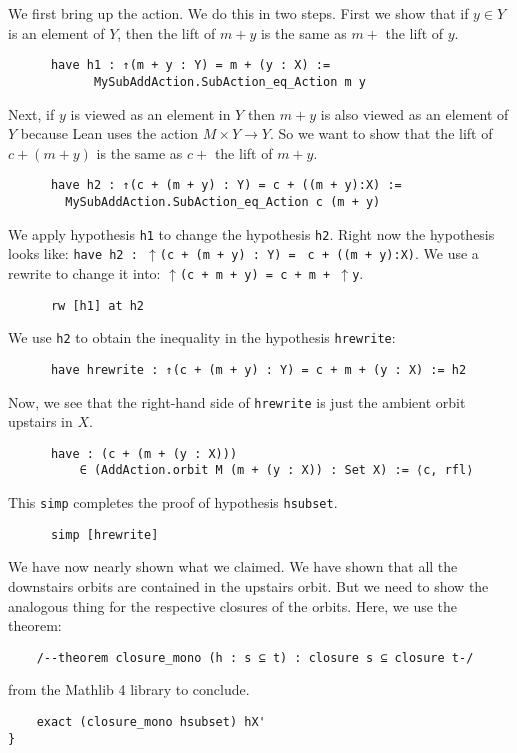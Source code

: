 \documentclass[11pt]{article}
\theoremstyle{definition}              %
\theoremstyle{definition}              %
\theoremstyle{definition}              %
\begin{document}
We first bring up the action. We do this in two steps. First we show that if $y \in Y$ is an element of $Y$, then the lift of $m+y$ is the same as $m+$ the lift of $y$.
\begin{lstlisting}
      have h1 : ↑(m + y : Y) = m + (y : X) :=
            MySubAddAction.SubAction_eq_Action m y
\end{lstlisting}
Next, if $y$ is viewed as an element in $Y$ then $m+y$ is also viewed as an element of $Y$ because Lean uses the action $M \times Y \to Y$. So we want to show that the lift of $c+(m+y)$ is the same as $c+$ the lift of $m+y$.
\begin{lstlisting}
      have h2 : ↑(c + (m + y) : Y) = c + ((m + y):X) :=
        MySubAddAction.SubAction_eq_Action c (m + y)
\end{lstlisting}
We apply hypothesis \verb|h1| to change the hypothesis \verb|h2|. Right now the hypothesis looks like: \verb|have h2 : |$\uparrow$\verb|(c + (m + y) : Y) = | \verb|c + ((m + y):X)|. We use a rewrite to change it into: $\uparrow$\verb|(c + m + y) = c + m + |$\uparrow$\verb|y|.
\begin{lstlisting}
      rw [h1] at h2
\end{lstlisting}
We use \verb|h2| to obtain the inequality in the hypothesis \verb|hrewrite|:
\begin{lstlisting}
      have hrewrite : ↑(c + (m + y) : Y) = c + m + (y : X) := h2
\end{lstlisting}
Now, we see that the right-hand side of \verb|hrewrite| is just the ambient orbit upstairs in $X$.
\begin{lstlisting}
      have : (c + (m + (y : X)))
          ∈ (AddAction.orbit M (m + (y : X)) : Set X) := ⟨c, rfl⟩
\end{lstlisting}
This \verb|simp| completes the proof of hypothesis \verb|hsubset|.
\begin{lstlisting}
      simp [hrewrite]
\end{lstlisting}
We have now nearly shown what we claimed. We have shown that all the downstairs orbits are contained in the upstairs orbit. But we need to show the analogous thing for the respective closures of the orbits. Here, we use the theorem:
\begin{lstlisting}
    /--theorem closure_mono (h : s ⊆ t) : closure s ⊆ closure t-/
\end{lstlisting}
from the Mathlib 4 library to conclude.
\begin{lstlisting}
    exact (closure_mono hsubset) hX'
}
\end{lstlisting}
\end{document}
